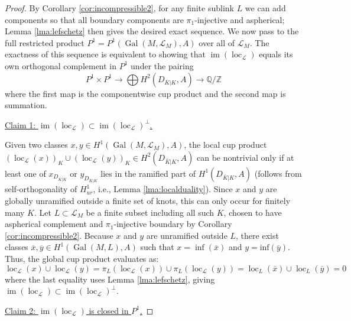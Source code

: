 \documentclass[10pt,a4paper]{amsart}
\DeclareMathOperator{\Gal}{\mathrm{Gal}}
\DeclareMathOperator{\im}{\mathrm{im}}
\DeclareMathOperator{\loc}{\mathrm{loc}}
\theoremstyle{plain}
\theoremstyle{definition}
\theoremstyle{remark}
\begin{document}
\begin{proof}
By Corollary \ref{cor:incompressible2}, for any finite sublink $L$ we can add components so that all boundary components are $\pi_1$-injective and aspherical; Lemma \ref{lma:lefschetz} then gives the desired exact sequence. We now pass to the full restricted product $P^1 = P^1(\Gal(M, \mathcal{L}_M), A)$ over all of $\mathcal{L}_M$. The exactness of this sequence is equivalent to showing that $\im(\loc_{\mathcal{L}})$ equals its own orthogonal complement in $P^1$ under the pairing
\begin{equation}
    P^1 \times P^1 \rightarrow \bigoplus H^2(D_{\overline{K}|K}, A) \to \mathbb{Q}/\mathbb{Z}
\end{equation}
where the first map is the componentwise cup product and the second map is summation.

\medskip

\underline{Claim 1: $\im(\loc_{\mathcal{L}}) \subset \im(\loc_{\mathcal{L}})^\perp$.}

\medskip

Given two classes $x, y \in H^1(\Gal(M, \mathcal{L}_M), A)$, the local cup product $(\loc_{\mathcal{L}}(x))_K \cup (\loc_{\mathcal{L}}(y))_K \in H^2(D_{\overline{K}|K}, A)$ can be nontrivial only if at least one of $x_{D_{\overline{K}|K}}$ or $y_{D_{\overline{K}|K}}$ lies in the ramified part of $H^1(D_{\overline{K}|K}, A)$ (follows from self-orthogonality of $H^1_{ur}$, i.e., Lemma \ref{lma:localduality}). Since $x$ and $y$ are globally unramified outside a finite set of knots, this can only occur for finitely many $K$. Let $L \subset \mathcal{L}_M$ be a finite subset including all such $K$, chosen to have aspherical complement and $\pi_1$-injective boundary by Corollary \ref{cor:incompressible2}. Because $x$ and $y$ are unramified outside $L$, there exist classes $\overline{x}, \overline{y} \in H^1(\Gal(M, L), A)$ such that $x = \inf(\overline{x})$ and $y = \text{inf}(\overline{y})$. Thus, the global cup product evaluates as:
\begin{equation}
    \loc_\mathcal{L}(x) \cup \loc_\mathcal{L}(y) = \pi_L(\loc_{\mathcal{L}}(x)) \cup \pi_L(\loc_{\mathcal{L}}(y)) = \loc_L(\overline{x}) \cup \loc_L(\overline{y}) = 0
\end{equation}
where the last equality uses Lemma \ref{lma:lefschetz}, giving $\im(\loc_{\mathcal{L}}) \subset \im(\loc_{\mathcal{L}})^\perp$.

\medskip

\underline{Claim 2: $\im(\loc_{\mathcal{L}})$ is closed in $P^1$.}


\end{proof}
\end{document}
